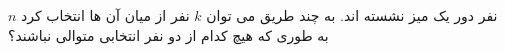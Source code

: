\exercise
$n$
نفر دور یک میز نشسته اند. به چند طریق می توان
$k$
نفر از میان آن ها انتخاب کرد به طوری که هیچ کدام از دو نفر انتخابی متوالی نباشند؟